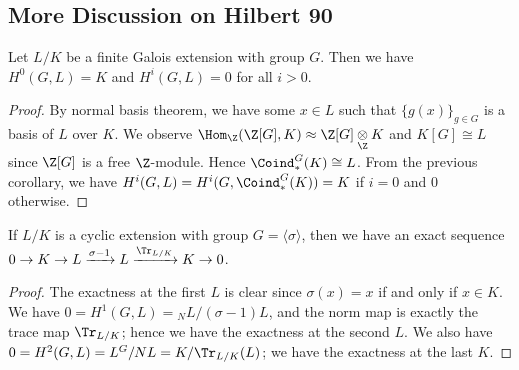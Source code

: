 \subsection{More Discussion on Hilbert 90}
\begin{theorem}
    Let $L/K$ be a finite Galois extension with group $G$.
    Then we have $H^0(G, L) = K$ and $H^i(G, L) = 0$ for all $i > 0$.
\end{theorem}
\begin{proof}
    By normal basis theorem, we have some $x \in L$ such that $\{g(x)\}_{g \in G}$ is a basis of $L$ over $K$.
    We observe $\Hom_\Z(\Z[G], K) \approx \Z[G]\underset{\Z}{\otimes} K$
    and $K[G] \cong L$ since $\Z[G]$ is a free $\Z$-module.
    Hence $\Coind^G_*(K) \cong L$.
    From the previous corollary, we have $H^i(G, L) = H^i(G, \Coind^G_*(K)) = K$ if $i = 0$ and $0$ otherwise.
\end{proof}

\begin{corollary}
    If $L/K$ is a cyclic extension with group $G = \langle \sigma \rangle$, then we have
    an exact sequence \(0 \to K \to L \xrightarrow{\sigma - 1} L \xrightarrow{\Tr_{L/K}} K \to 0\).
\end{corollary}
\begin{proof}
    The exactness at the first $L$ is clear since $\sigma(x) = x$ if and only if $x \in K$.
    We have $0=H^1(G,L) = {}_NL /(\sigma - 1)L$,
    and the norm map is exactly the trace map $\Tr_{L/K}$;
    hence we have the exactness at the second $L$.
    We also have $0 = H^2(G, L) = L^G / NL = K/\Tr_{L/K}(L)$; we have the exactness at the last $K$.
\end{proof}
